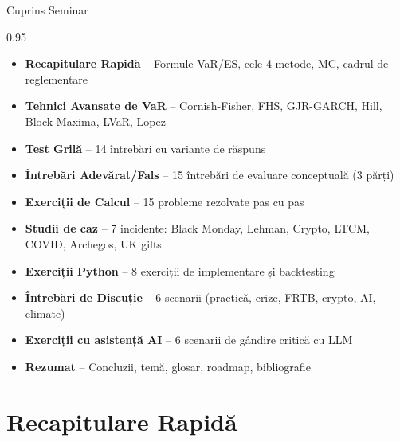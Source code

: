 \documentclass[9pt, aspectratio=169, t]{beamer}
\subtitle{Value-at-Risk și Expected Shortfall}
\begin{document}
{
\begin{frame}
    \titlepage
\end{frame}
}

\begin{frame}{Cuprins Seminar}
    \begin{cminipage}{0.95\textwidth}
    \begin{itemize}\setlength{\itemsep}{0pt}
        \item \textbf{Recapitulare Rapidă} -- Formule VaR/ES, cele 4 metode, MC, cadrul de reglementare
        \item \textbf{Tehnici Avansate de VaR} -- Cornish-Fisher, FHS, GJR-GARCH, Hill, Block Maxima, LVaR, Lopez
        \item \textbf{Test Grilă} -- 14 întrebări cu variante de răspuns
        \item \textbf{Întrebări Adevărat/Fals} -- 15 întrebări de evaluare conceptuală (3 părți)
        \item \textbf{Exerciții de Calcul} -- 15 probleme rezolvate pas cu pas
        \item \textbf{Studii de caz} -- 7 incidente: Black Monday, Lehman, Crypto, LTCM, COVID, Archegos, UK gilts
        \item \textbf{Exerciții Python} -- 8 exerciții de implementare și backtesting
        \item \textbf{Întrebări de Discuție} -- 6 scenarii (practică, crize, FRTB, crypto, AI, climate)
        \item \textbf{Exerciții cu asistență AI} -- 6 scenarii de gândire critică cu LLM
        \item \textbf{Rezumat} -- Concluzii, temă, glosar, roadmap, bibliografie
    \end{itemize}
    \end{cminipage}
\end{frame}

\section{Recapitulare Rapidă}
\end{document}
